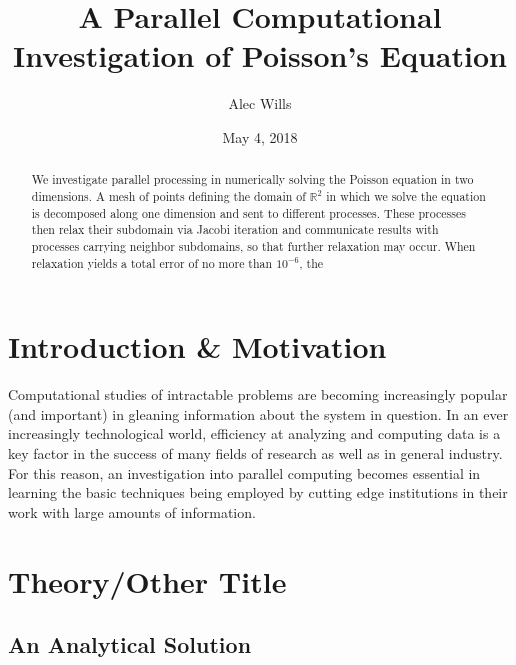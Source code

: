 \documentclass[reprint, amsmath, amssymb, aps, floatfix]{revtex4-1}
\begin{document}
\title{A Parallel Computational Investigation of Poisson's Equation}

\author{Alec Wills}
\date{May 4, 2018}

\begin{abstract}
	We investigate  parallel processing in numerically solving the Poisson equation in two dimensions. A mesh of points defining the domain of $\mathbb{R}^2$ in which we solve the equation is decomposed along one dimension and sent to different processes. These processes then relax their subdomain via Jacobi iteration and communicate results with processes carrying neighbor subdomains, so that further relaxation may occur. When relaxation yields a total error of no more than $10^{-6}$, the 
\end{abstract}

\maketitle

\section{Introduction \& Motivation}

Computational studies of intractable problems are becoming increasingly popular (and important) in gleaning information about the system in question. In an ever increasingly technological world, efficiency at analyzing and computing data is a key factor in the success of many fields of research as well as in general industry. For this reason, an investigation into parallel computing becomes essential in learning the basic techniques being employed by cutting edge institutions in their work with large amounts of information.



\section{Theory/Other Title}

\subsection{An Analytical Solution}
\end{document}
